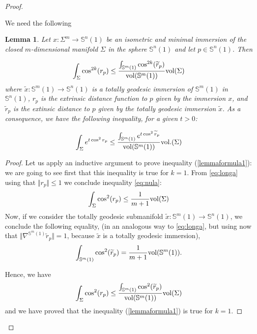 \documentclass{amsart}
\newtheorem{lemma}[theorem]{Lemma}
\theoremstyle{definition}
\theoremstyle{remark}
\newcommand{\ese}{\mathbb{S}}
\begin{document}
\begin{proof}\

We need the following 

\begin{lemma}
Let  $x: \Sigma^m \to \mathbb{S}^n(1)$ be an isometric and minimal immersion of the closed $m$-dimensional manifold $\Sigma$ in the sphere  $\mathbb{S}^n(1)$ and let $p\in \mathbb{S}^n(1)$. Then

\begin{equation}\label{lemmaformula1}
\int_\Sigma \cos^{2k}(r_p) \leq \frac{\int_{\mathbb{S}^m(1)} \cos^{2k}(\widetilde{r}_p)}{{\rm vol}(\mathbb{S}^m(1))} {\rm vol}(\Sigma)
\end{equation}
where  $\widetilde{x}: \mathbb{S}^m(1) \rightarrow \mathbb{S}^n(1)$ is a totally geodesic immersion of $\ese^m(1)$ in $\ese^n(1)$, $r_p$ is the extrinsic distance function to $p$ given by the immersion $x$, and $\widetilde{r}_p$ is the extinsic distance to $p$ given by the totally geodesic immersion $\widetilde{x}$. As a consequence, we have the following inequality,  for a given $t>0$:

\begin{equation}\label{lemmaformula2}
\int_{\Sigma} e^{t \cos^2r_p}  \leq\frac{\int_{\ese^m(1)} e^{t \cos^2\widetilde{r}_p}}{{\rm vol}(\mathbb{S}^m(1))} {\rm vol}.(\Sigma)
\end{equation}
\end{lemma}
\begin{proof}

Let us apply an inductive argument to prove inequality (\ref{lemmaformula1}): we are going to see first that this inequality is true for $k=1$.  From \eqref{eq:longa} using that $\Vert r_p\Vert\leq 1$ we conclude inequality \eqref{eq:nula}:
$$
\int_\Sigma \cos^2(r_p) \leq \frac{1}{m+1} {\rm vol}(\Sigma)
$$
Now, if we consider the totally geodesic submanifold $\widetilde{x}: \mathbb{S}^m(1) \rightarrow \mathbb{S}^n(1)$, we conclude the following equality, (in an analogous way  to \eqref{eq:longa}, but using now that $\Vert\nabla^{\mathbb{S}^m(1)} \widetilde{r}_p\Vert=1$, because $\widetilde{x}$ is a totally geodesic immersion), 
\begin{equation}\label{eqcinc}
\int_{\mathbb{S}^m(1)} \cos^2(\widetilde{r}_p) = \frac{1}{m+1} {\rm vol}(\mathbb{S}^m(1)).
\end{equation}

Hence,  we have 
\begin{equation}\label{eqsis}
\int_\Sigma \cos^2(r_p) \leq \frac{\int_{\mathbb{S}^m(1)} \cos^2(\widetilde{r}_p)}{{\rm vol}(\mathbb{S}^m(1))} {\rm vol}(\Sigma)
\end{equation}
and we have proved that the inequality (\ref{lemmaformula1}) is true for $k=1$.


\end{proof}
\end{proof}
\end{document}
